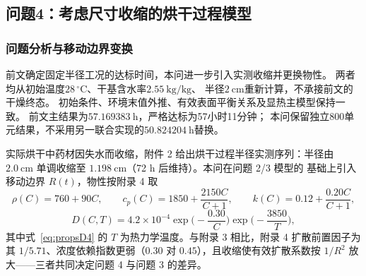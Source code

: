 \subsection{问题4：考虑尺寸收缩的烘干过程模型}

\subsubsection{问题分析与移动边界变换}

前文确定固定半径工况的达标时间，本问进一步引入实测收缩并更换物性。
两者均从初始温度$28\,^{\circ}\mathrm C$、干基含水率$2.55\ \mathrm{kg/kg}$、
半径$2\ \mathrm{cm}$重新计算，不承接前文的干燥终态。
初始条件、环境末值外推、有效表面平衡关系及显热主模型保持一致。
前文主结果为$57.169383\ \mathrm h$，严格达标为57小时11分钟；
本问保留独立800单元结果，不采用另一联合实现的$50.824204\ \mathrm h$替换。

实际烘干中药材因失水而收缩，附件 2 给出烘干过程半径实测序列：半径由
$2.0\ \mathrm{cm}$ 单调收缩至 $1.198\ \mathrm{cm}$（72 h 后维持）。本问在问题 2/3 模型的
基础上引入移动边界 $R(t)$，物性按附录 4 取
\begin{equation}
  \rho(C)=760+90C,\qquad
  c_p(C)=1850+\frac{2150C}{C+1},\qquad
  k(C)=0.12+\frac{0.20C}{C+1},
  \label{eq:props4}
\end{equation}
\begin{equation}
  D(C,T)=4.2\times10^{-4}\exp\Big(-\frac{0.30}{C}\Big)\exp\Big(-\frac{3850}{T}\Big),
  \label{eq:propsD4}
\end{equation}
其中式~\eqref{eq:propsD4} 的 $T$ 为热力学温度。与附录 3 相比，附录 4 扩散前置因子为
其 $1/5.71$、浓度依赖指数更弱（$0.30$ 对 $0.45$），且收缩使有效扩散系数按 $1/R^2$
放大——三者共同决定问题 4 与问题 3 的差异。

